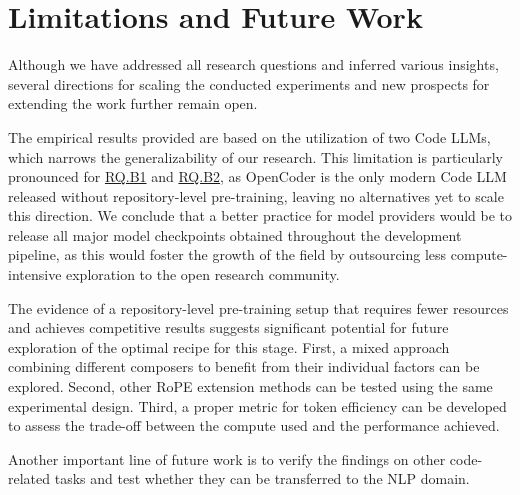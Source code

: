 \section{Limitations and Future Work}

Although we have addressed all research questions and inferred various insights, several directions for scaling the conducted experiments and new prospects for extending the work further remain open.

The empirical results provided are based on the utilization of two Code LLMs, which narrows the generalizability of our research. This limitation is particularly pronounced for \hyperref[rq:rq-b1]{RQ.B1} and \hyperref[rq:rq-b2]{RQ.B2}, as OpenCoder is the only modern Code LLM released without repository-level pre-training, leaving no alternatives yet to scale this direction. We conclude that a better practice for model providers would be to release all major model checkpoints obtained throughout the development pipeline, as this would foster the growth of the field by outsourcing less compute-intensive exploration to the open research community.

The evidence of a repository-level pre-training setup that requires fewer resources and achieves competitive results suggests significant potential for future exploration of the optimal recipe for this stage. First, a mixed approach combining different composers to benefit from their individual factors can be explored. Second, other RoPE extension methods can be tested using the same experimental design. Third, a proper metric for token efficiency can be developed to assess the trade-off between the compute used and the performance achieved.

Another important line of future work is to verify the findings on other code-related tasks and test whether they can be transferred to the NLP domain.
